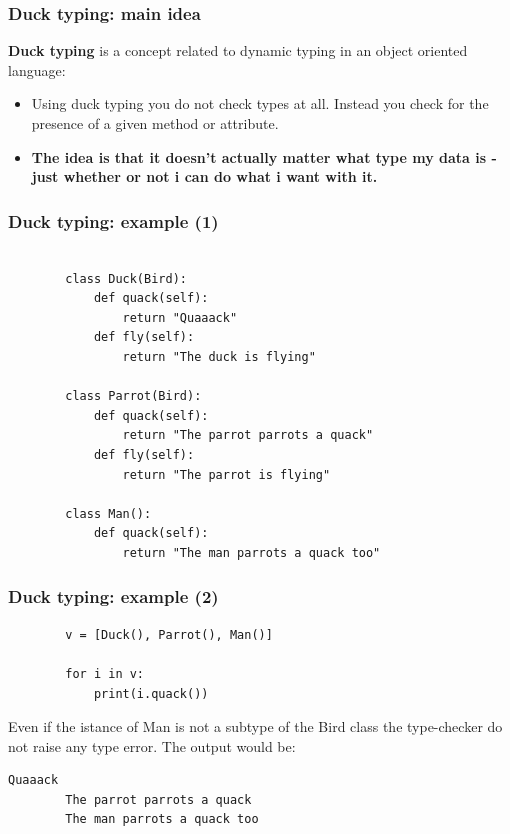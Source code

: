 \documentclass[xcolor ={table,usenames,dvipsnames}]{beamer}
\theoremstyle{definition}
\begin{document}
	\begin{frame}
		\frametitle{Duck typing: main idea}
		\textbf{Duck typing} is a concept related to dynamic typing in an object oriented language:
		\begin{itemize}
			\item Using duck typing you do not check types at all. Instead you check for the presence of a given method or attribute.
			\item \textbf{The idea is that it doesn't actually matter what type my data is - just whether or not i can do what i want with it.}
		\end{itemize}
	\end{frame}

	\begin{frame}[fragile]
		\frametitle{Duck typing: example (1)}
		\begin{lstlisting}[]
		
		class Duck(Bird):
			def quack(self):
				return "Quaaack"
			def fly(self):
				return "The duck is flying"
		
		class Parrot(Bird):
			def quack(self):
				return "The parrot parrots a quack"
			def fly(self):
				return "The parrot is flying"
		
		class Man():
			def quack(self):
				return "The man parrots a quack too"

		\end{lstlisting}
	\end{frame}

	\begin{frame}[fragile]
		\frametitle{Duck typing: example (2)}
		\begin{lstlisting}	
		v = [Duck(), Parrot(), Man()]
		
		for i in v:
			print(i.quack())
		\end{lstlisting}
		Even if the istance of Man is not a subtype of the Bird class the type-checker do not raise any type error. The output would be:
		
		\begin{lstlisting}[keywordstyle=\color{black},
		commentstyle=\color{black},
		stringstyle=\color{black}.]	
		Quaaack
		The parrot parrots a quack
		The man parrots a quack too
		\end{lstlisting}
		
		
		
	\end{frame}
\end{document}
